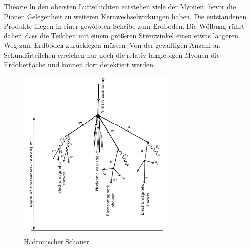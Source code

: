 \documentclass[a4paper,11pt,liststotocnumbered,bibtotocnumbered]{scrartcl}
\begin{document}
\begin{section}{Théorie}
   In den obersten Luftschichten entstehen viele der Myonen, bevor die Pionen Gelegenheit zu weiteren Kernwechselwirkungen haben. Die entstandenen Produkte fliegen in einer gewölbten Scheibe zum Erdboden. Die Wölbung rührt daher, dass die Teilchen mit einem größeren Streuwinkel einen etwas längeren Weg zum Erdboden zurücklegen müssen. Von der gewaltigen Anzahl an Sekundärteilchen erreichen nur noch die relativ langlebigen Myonen die Erdoberfläche und können dort detektiert werden. 

   \begin{figure}[htb]
    \center
    \includegraphics[width=0.7\textwidth]{bilder/hadronischer_schauer.jpg}
    \caption{Hadronischer Schauer}
   \end{figure}
 \end{section}
  
\end{document}

